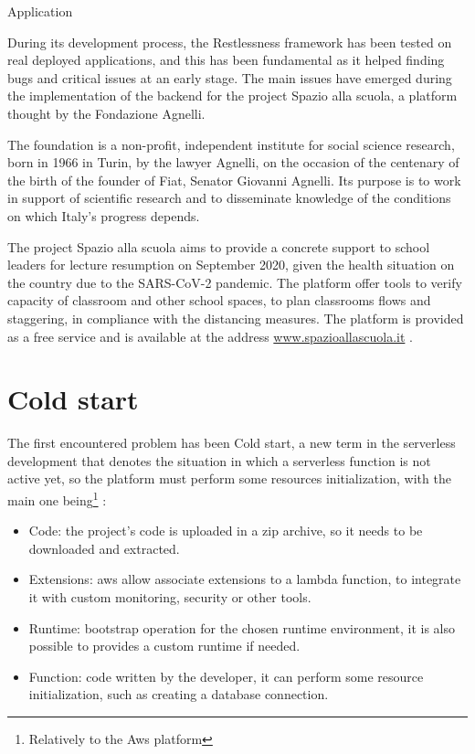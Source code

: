 \begin{chapter}{Application}
    \label{chap:application}

    During its development process, the Restlessness framework has been tested on
    real deployed applications, and this has been fundamental as it helped finding
    bugs and critical issues at an early stage.
    The main issues have emerged during the implementation of the backend for the
    project Spazio alla scuola, a platform thought by the Fondazione Agnelli.

    The foundation is a non-profit, independent institute for social science research,
    born in 1966 in Turin, by the lawyer Agnelli, on the occasion of the centenary
    of the birth of the founder of Fiat, Senator Giovanni Agnelli.
    Its purpose is to work in support of scientific research and to disseminate
    knowledge of the conditions on which Italy's progress depends.

    The project Spazio alla scuola aims to provide a concrete support to school
    leaders for lecture resumption on September 2020, given the health situation on the
    country due to the SARS-CoV-2 pandemic.
    The platform offer tools to verify capacity of classroom and other school spaces,
    to plan classrooms flows and staggering, in compliance with the distancing measures.
    The platform is provided as a free service and is available at the address
    \url{www.spazioallascuola.it} \cite{spazio_alla_scuola}.

    \section{Cold start}
    \label{subsec:cold_start}

    The first encountered problem has been Cold start, a new term in the serverless
    development that denotes the situation in which a serverless function is not
    active yet, so the platform must perform some resources initialization, with the
    main one being\footnote{Relatively to the Aws platform} \cite{aws_doc_runtimes}:

    \begin{itemize}
        \item Code: the project's code is uploaded in a zip archive, so it needs to
            be downloaded and extracted.
        \item Extensions: aws allow associate extensions to a lambda function, to
            integrate it with custom monitoring, security or other tools.
        \item Runtime: bootstrap operation for the chosen runtime environment,
            it is also possible to provides a custom runtime if needed.
        \item Function: code written by the developer, it can perform some resource
            initialization, such as creating a database connection.
    \end{itemize}


\end{chapter}
